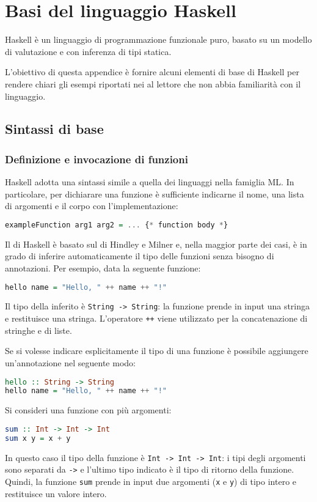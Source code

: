 \chapter{Basi del linguaggio Haskell}
\label{app:haskell}

Haskell è un linguaggio di programmazione funzionale puro, basato su un modello di valutazione  e con inferenza di tipi statica.

L'obiettivo di questa appendice è fornire alcuni elementi di base di Haskell per rendere chiari gli esempi riportati nei  al lettore che non abbia familiarità con il linguaggio.

\section{Sintassi di base}
\subsection{Definizione e invocazione di funzioni}
Haskell adotta una sintassi simile a quella dei linguaggi nella famiglia ML. In particolare, per dichiarare una funzione è sufficiente indicarne il nome, una lista di argomenti e il corpo con l'implementazione:
\begin{lstlisting}[language=haskell]
exampleFunction arg1 arg2 = ... {* function body *}
\end{lstlisting}

Il  di Haskell è basato sul  di Hindley e Milner e, nella maggior parte dei casi, è in grado di inferire automaticamente il tipo delle funzioni senza bisogno di annotazioni.
Per esempio, data la seguente funzione:
\begin{lstlisting}[language=haskell]
hello name = "Hello, " ++ name ++ "!"
\end{lstlisting}
Il tipo della inferito è \lstinline{String -> String}: la funzione prende in input una stringa e restituisce una stringa. L'operatore \lstinline{++} viene utilizzato per la concatenazione di stringhe e di liste.

Se si volesse indicare esplicitamente il tipo di una funzione è possibile aggiungere un'annotazione nel seguente modo:
\begin{lstlisting}[language=haskell]
hello :: String -> String
hello name = "Hello, " ++ name ++ "!"
\end{lstlisting}

Si consideri una funzione con più argomenti:
\begin{lstlisting}[language=haskell]
sum :: Int -> Int -> Int
sum x y = x + y
\end{lstlisting}
In questo caso il tipo della funzione è \lstinline{Int -> Int -> Int}: i tipi degli argomenti sono separati da \lstinline{->} e l'ultimo tipo indicato è il tipo di ritorno della funzione. Quindi, la funzione \lstinline{sum} prende in input due argomenti (\lstinline{x} e \lstinline{y}) di tipo intero e restituisce un valore intero.

